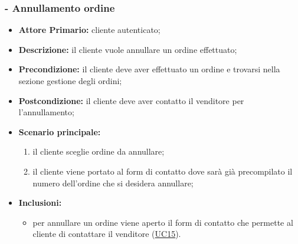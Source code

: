 \subsubsection{ - Annullamento ordine}
\begin{itemize}
\item \textbf{Attore Primario:} cliente autenticato;
\item \textbf{Descrizione:} il cliente vuole annullare un ordine effettuato;
\item \textbf{Precondizione:} il cliente deve aver effettuato un ordine e trovarsi nella sezione gestione degli ordini;
\item \textbf{Postcondizione:} il cliente deve aver contatto il venditore per l'annullamento;
\item \textbf{Scenario principale:}
\begin{enumerate}
    \item il cliente sceglie ordine da annullare;
    \item il cliente viene portato al form di contatto dove sarà già precompilato il numero dell'ordine che si desidera annullare;
\end{enumerate}
\item \textbf{Inclusioni:}
\begin{itemize}
    \item per annullare un ordine viene aperto il form di contatto che permette al cliente di contattare il venditore (\hyperref[UC15]{UC15}).
\end{itemize}
\end{itemize}

\stepsubUserCase
